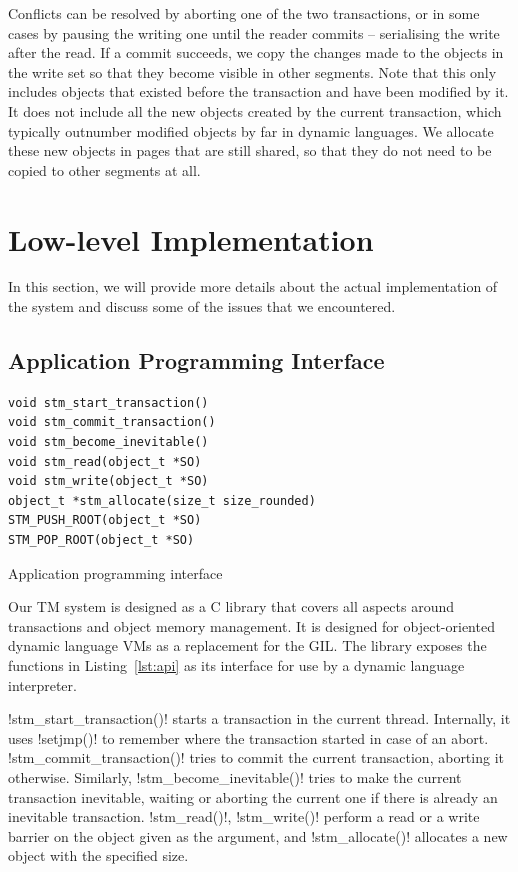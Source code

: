 \documentclass{sigplanconf}
\makeatletter
\renewcommand\lstinline[1][]{%
  \Collectverb{\@@myverb}%
}
\def\@@myverb#1{%
    \begingroup
    \fboxsep=0.2em
    \colorbox{verylightgray}{\oldlstinline|#1|}%
    \endgroup
}
\makeatother
\begin{document}
Conflicts can be resolved by aborting one of the two transactions, or
in some cases by pausing the writing one until the reader commits --
serialising the write after the read.  If a
commit succeeds, we copy the changes made to the objects in the write
set so that they become visible in other segments.  Note that this
only includes objects that existed before the transaction and have
been modified by it.  It does not include all the new objects created
by the current transaction, which typically outnumber modified objects
by far in dynamic languages.  We allocate these new objects in pages
that are still shared, so that they do not need to be copied to other
segments at all.



\section{Low-level Implementation\label{sub:Low-level-Implementation}}

In this section, we will provide more details about the actual
implementation of the system and discuss some of the issues that we
encountered.


\subsection{Application Programming Interface\label{sub:Application-Programming-Interfac}}

\begin{code}[h]
\begin{lstlisting}
void stm_start_transaction()
void stm_commit_transaction()
void stm_become_inevitable()
void stm_read(object_t *SO)
void stm_write(object_t *SO)
object_t *stm_allocate(size_t size_rounded)
STM_PUSH_ROOT(object_t *SO)
STM_POP_ROOT(object_t *SO)
\end{lstlisting}
\caption{Application programming interface\label{lst:api}}
\end{code}

Our TM system is designed as a C library that covers all aspects around
transactions and object memory management. It is designed for
object-oriented dynamic language VMs as a replacement for the GIL.
The library exposes the functions in Listing~\ref{lst:api} as its
interface for use by a dynamic language interpreter.

\lstinline!stm_start_transaction()!  starts a transaction in the
current thread. Internally, it uses \lstinline!setjmp()! to remember
where the transaction started in case of an abort.
\lstinline!stm_commit_transaction()! tries to commit the current
transaction, aborting it otherwise. Similarly,
\lstinline!stm_become_inevitable()!  tries to make the current
transaction inevitable, waiting or aborting the current one if there
is already an inevitable transaction.
 \lstinline!stm_read()!, \lstinline!stm_write()!  perform
a read or a write barrier on the object given as the argument, and
\lstinline!stm_allocate()!  allocates a new object with the specified
size.
\end{document}
